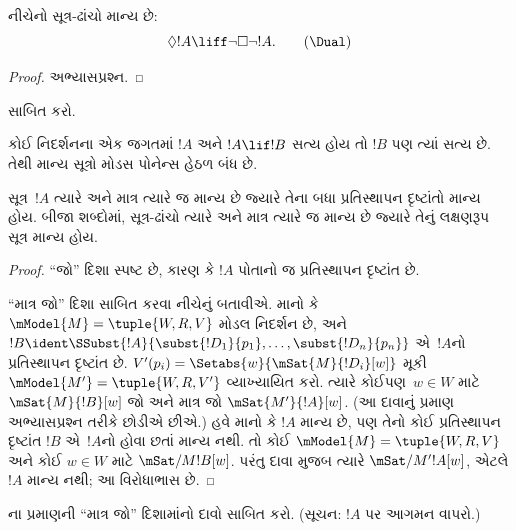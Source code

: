 \begin{prop}
  નીચેનો સૂત્ર-ઢાંચો \Dual{} માન્ય છે:
  \begin{equation*}
  \Diamond !A \liff \lnot\Box\lnot !A. \tag{\Dual}
  \end{equation*}
\end{prop}

\begin{proof}
  અભ્યાસપ્રશ્ન.
\end{proof}

\begin{prob}
   સાબિત કરો.
\end{prob}

\begin{prop}
  કોઈ નિદર્શનના એક જગતમાં $!A$ અને $!A \lif !B$
  સત્ય હોય તો $!B$ પણ ત્યાં સત્ય છે. તેથી માન્ય
  સૂત્રો મોડસ પોનેન્સ હેઠળ બંધ છે.
\end{prop}

\begin{prop}
  સૂત્ર~$!A$ ત્યારે અને માત્ર ત્યારે જ માન્ય છે
  જ્યારે તેના બધા પ્રતિસ્થાપન દૃષ્ટાંતો માન્ય હોય.
  બીજા શબ્દોમાં, સૂત્ર-ઢાંચો ત્યારે અને માત્ર ત્યારે જ
  માન્ય છે જ્યારે તેનું લક્ષણરૂપ સૂત્ર માન્ય હોય.
\end{prop}

\begin{proof}
  ``જો'' દિશા સ્પષ્ટ છે, કારણ કે $!A$ પોતાનો જ
  પ્રતિસ્થાપન દૃષ્ટાંત છે.

  ``માત્ર જો'' દિશા સાબિત કરવા નીચેનું બતાવીએ. માનો કે
  $\mModel{M} = \tuple{W, R, V}$ મોડલ નિદર્શન છે,
  અને $!B \ident
  \SSubst{!A}{\subst{!D_1}{p_1},\dots,\subst{!D_n}{p_n}}$
  એ~$!A$નો પ્રતિસ્થાપન દૃષ્ટાંત છે. $V'(p_i) =
  \Setabs{w}{\mSat{M}{!D_i}[w]}$ મૂકી $\mModel{M'} = \tuple{W, R,
    V'}$ વ્યાખ્યાયિત કરો. ત્યારે કોઈપણ~$w \in W$ માટે
  $\mSat{M}{!B}[w]$ જો અને માત્ર જો $\mSat{M'}{!A}[w]$.
  (આ દાવાનું પ્રમાણ અભ્યાસપ્રશ્ન તરીકે છોડીએ છીએ.)
  હવે માનો કે $!A$ માન્ય છે, પણ તેનો કોઈ પ્રતિસ્થાપન
  દૃષ્ટાંત $!B$ એ~$!A$નો હોવા છતાં માન્ય નથી. તો કોઈ $\mModel{M} =
  \tuple{W, R, V}$ અને કોઈ $w \in W$ માટે
  $\mSat/{M}{!B}[w]$. પરંતુ દાવા મુજબ ત્યારે
  $\mSat/{M'}{!A}[w]$, એટલે $!A$ માન્ય નથી;
  આ વિરોધાભાસ છે.
\end{proof}

\begin{prob}
  ના પ્રમાણની
  ``માત્ર જો'' દિશામાંનો દાવો સાબિત કરો. (સૂચન:
  $!A$ પર આગમન વાપરો.)
\end{prob}

